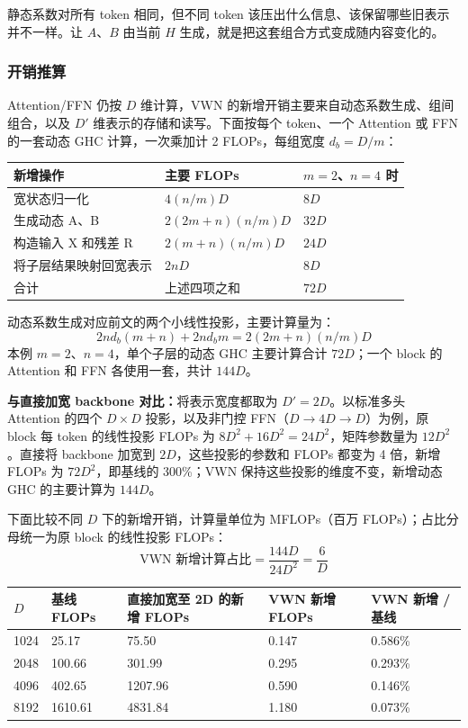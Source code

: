 \documentclass[11pt]{article}
\begin{document}
静态系数对所有 token 相同，但不同 token 该压出什么信息、该保留哪些旧表示并不一样。让 $A$、$B$ 由当前 $H$ 生成，就是把这套组合方式变成随内容变化的。

\subsubsection{开销推算}

Attention/FFN 仍按 $D$ 维计算，VWN 的新增开销主要来自动态系数生成、组间组合，以及 $D'$ 维表示的存储和读写。下面按每个 token、一个 Attention 或 FFN 的一套动态 GHC 计算，一次乘加计 2 FLOPs，每组宽度 $d_b=D/m$：

\begin{table}[htbp]
  \centering
  \small
  \begin{tabular}{p{5.4cm}p{5.0cm}p{4.0cm}}
    \hline
    \textbf{新增操作} & \textbf{主要 FLOPs} & \textbf{$m=2$、$n=4$ 时} \\
    \hline
    宽状态归一化 & $4(n/m)D$ & $8D$ \\
    \hline
    生成动态 A、B & $2(2m+n)(n/m)D$ & $32D$ \\
    \hline
    构造输入 X 和残差 R & $2(m+n)(n/m)D$ & $24D$ \\
    \hline
    将子层结果映射回宽表示 & $2nD$ & $8D$ \\
    \hline
    合计 & 上述四项之和 & $72D$ \\
    \hline
  \end{tabular}
\end{table}

动态系数生成对应前文的两个小线性投影，主要计算量为：
\[
  2n d_b (m+n)+2n d_b m=2(2m+n)(n/m)D
\]
本例 $m=2$、$n=4$，单个子层的动态 GHC 主要计算合计 $72D$；一个 block 的 Attention 和 FFN 各使用一套，共计 $144D$。

\textbf{与直接加宽 backbone 对比：}将表示宽度都取为 $D' = 2D$。以标准多头 Attention 的四个 $D\times D$ 投影，以及非门控 FFN（$D\to4D\to D$）为例，原 block 每 token 的线性投影 FLOPs 为 $8D^2+16D^2=24D^2$，矩阵参数量为 $12D^2$。直接将 backbone 加宽到 $2D$，这些投影的参数和 FLOPs 都变为 4 倍，新增 FLOPs 为 $72D^2$，即基线的 300\%；VWN 保持这些投影的维度不变，新增动态 GHC 的主要计算为 $144D$。

下面比较不同 $D$ 下的新增开销，计算量单位为 MFLOPs（百万 FLOPs）；占比分母统一为原 block 的线性投影 FLOPs：
\[
  \text{VWN 新增计算占比}=\frac{144D}{24D^2}=\frac{6}{D}
\]
\begin{table}[htbp]
  \centering
  \small
  \begin{tabular}{p{1.6cm}p{2.8cm}p{3.6cm}p{3.0cm}p{3.0cm}}
    \hline
    $D$ & 基线 FLOPs & 直接加宽至 2D 的新增 FLOPs & VWN 新增 FLOPs & VWN 新增 / 基线 \\
    \hline
    1024 & 25.17 & 75.50 & 0.147 & 0.586\% \\
    \hline
    2048 & 100.66 & 301.99 & 0.295 & 0.293\% \\
    \hline
    4096 & 402.65 & 1207.96 & 0.590 & 0.146\% \\
    \hline
    8192 & 1610.61 & 4831.84 & 1.180 & 0.073\% \\
    \hline
  \end{tabular}
\end{table}
\end{document}

